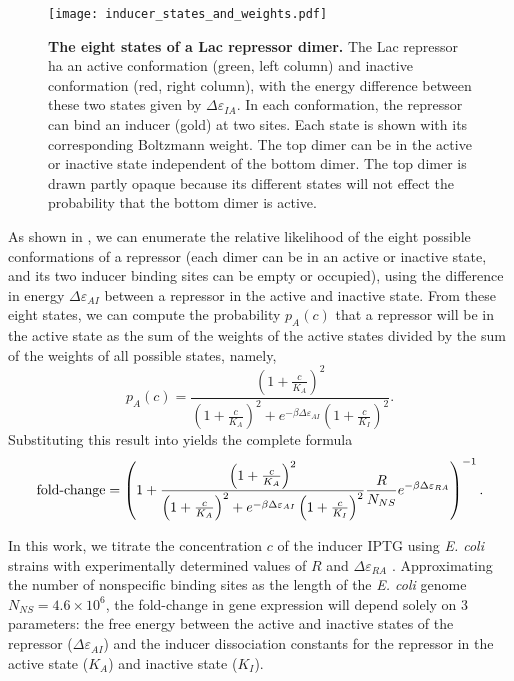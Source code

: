 \begin{figure}[h]
	\centering \texttt{[image: inducer\_states\_and\_weights.pdf]}
	\caption{{\bf The eight states of a Lac repressor dimer. } The Lac repressor ha\globalScalePlotss
		an active conformation (green, left column) and inactive conformation (red,
		right column), with the energy difference between these two states given by
		$\Delta \varepsilon_{IA}$. In each conformation, the repressor can bind an inducer (gold) at
		two sites. Each state is shown with its corresponding Boltzmann weight. The top
		dimer can be in the active or inactive state independent of the bottom dimer.
		The top dimer is drawn partly opaque because its different states will not
		effect the probability that the bottom dimer is active. %
	} \label{figrepressorInducerStates}
\end{figure}

As shown in \fref[figrepressorInducerStates], we can enumerate the relative
likelihood of the eight possible conformations of a repressor (each dimer
can be in an active or inactive state, and its two inducer binding sites
can be empty or occupied), using the difference in energy $\Delta \varepsilon_{AI}$ between a
repressor in the active and inactive state. From these eight states, we can
compute the probability $p_A(c)$ that a repressor will be in the active state
as the sum of the weights of the active states divided by the sum of the weights
of all possible states, namely,
\begin{equation}\label{eq6}
p_A(c)=\frac{\left(1+\frac{c}{K_A}\right)^2}{\left(1+\frac{c}{K_A}\right)^2+e^{-\beta  \Delta \varepsilon_{AI} }\left(1+\frac{c}{K_I}\right)^2}.
\end{equation}
Substituting this result into \eref[eq5] yields the
complete formula
\begin{equation}\label{eq7}
\operatorname{fold-change}= \left(
1+\frac{\left(1+\frac{c}{K_A}\right)^2}{\left(1+\frac{c}{K_A}\right)^2+e^{-\beta  \Delta \varepsilon_{AI} }\left(1+\frac{c}{K_I}\right)^2}\frac{R}{N_{NS}}e^{-\beta \Delta\varepsilon_{RA}} \right)^{-1}.
\end{equation}

In this work, we titrate the concentration \(c\) of the inducer IPTG using
\textit{E. coli} strains with experimentally determined values of $R$ and
$\Delta\varepsilon_{RA}$ \cite{Garcia2011}. Approximating the number of
nonspecific binding sites as the length of the \textit{E. coli} genome $N_{NS} =
4.6 \times 10^6$, the
fold-change in gene expression will depend solely on 3 parameters: the free
energy between the active and inactive states of the repressor
($\Delta\varepsilon_{AI}$) and the inducer dissociation constants for the
repressor in the active state ($K_A$) and inactive state ($K_I$).
